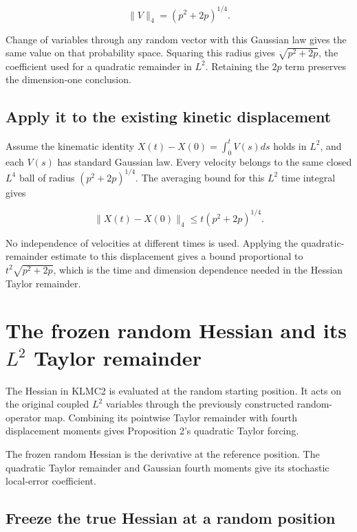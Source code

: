 \documentclass[11pt,a4paper]{report}
\begin{document}
\[\|V\|_4=(p^2+2p)^{1/4}.\]

Change of variables through any random vector with this Gaussian law gives the same value on that probability space. Squaring this radius gives \(\sqrt{p^2+2p}\), the coefficient used for a quadratic remainder in \(L^2\). Retaining the \(2p\) term preserves the dimension-one conclusion.

\subsection{\texorpdfstring{Apply it to the existing kinetic displacement}{Apply it to the existing kinetic displacement}}
\label{report-step-KineticLangevin-LpMomentBounds-lean-3}


Assume the kinematic identity \(X(t)-X(0)=\int_0^tV(s)ds\) holds in \(L^2\), and each \(V(s)\) has standard Gaussian law. Every velocity belongs to the same closed \(L^4\) ball of radius \((p^2+2p)^{1/4}\). The averaging bound for this \(L^2\) time integral gives

\[\|X(t)-X(0)\|_4\le t(p^2+2p)^{1/4}.\]

No independence of velocities at different times is used. Applying the quadratic-remainder estimate to this displacement gives a bound proportional to \(t^2\sqrt{p^2+2p}\), which is the time and dimension dependence needed in the Hessian Taylor remainder.

\section{\texorpdfstring{The frozen random Hessian and its \(L^{2}\) Taylor remainder}{The frozen random Hessian and its L² Taylor remainder}}
\label{proof-module-KineticLangevin-LpHessian-lean}


The Hessian in KLMC2 is evaluated at the random starting position. It acts on the original coupled \(L^{2}\) variables through the previously constructed random-operator map. Combining its pointwise Taylor remainder with fourth displacement moments gives Proposition 2’s quadratic Taylor forcing.



The frozen random Hessian is the derivative at the reference position. The quadratic Taylor remainder and Gaussian fourth moments give its stochastic local-error coefficient.

\subsection{\texorpdfstring{Freeze the true Hessian at a random position}{Freeze the true Hessian at a random position}}
\label{report-step-KineticLangevin-LpHessian-lean-1}
\end{document}
